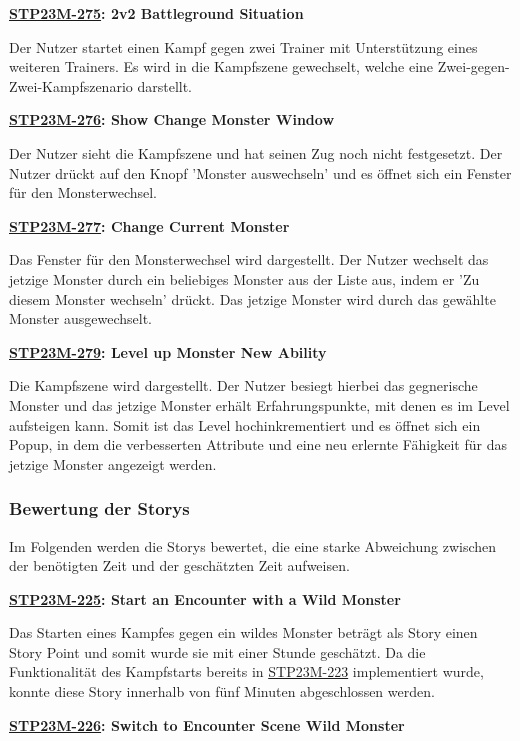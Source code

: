\textbf{\hyperlink{T275}{\hypertarget{S275}{STP23M-275}}: 2v2 Battleground Situation}

Der Nutzer startet einen Kampf gegen zwei Trainer mit Unterstützung eines weiteren Trainers. Es wird in die Kampfszene gewechselt, welche eine Zwei-gegen-Zwei-Kampfszenario darstellt.

\textbf{\hyperlink{T276}{\hypertarget{S276}{STP23M-276}}: Show Change Monster Window}

Der Nutzer sieht die Kampfszene und hat seinen Zug noch nicht festgesetzt. Der Nutzer drückt auf den Knopf 'Monster auswechseln' und es öffnet sich ein Fenster für den Monsterwechsel.

\textbf{\hyperlink{T277}{\hypertarget{S277}{STP23M-277}}: Change Current Monster}

Das Fenster für den Monsterwechsel wird dargestellt. Der Nutzer wechselt das jetzige Monster durch ein beliebiges Monster aus der Liste aus, indem er 'Zu diesem Monster wechseln' drückt. Das jetzige Monster wird durch das gewählte Monster ausgewechselt.

\textbf{\hyperlink{T279}{\hypertarget{S279}{STP23M-279}}: Level up Monster New Ability}

Die Kampfszene wird dargestellt. Der Nutzer besiegt hierbei das gegnerische Monster und das jetzige Monster erhält Erfahrungspunkte, mit denen es im Level aufsteigen kann. Somit ist das Level hochinkrementiert und es öffnet sich ein Popup, in dem die verbesserten Attribute und eine neu erlernte Fähigkeit für das jetzige Monster angezeigt werden.
\subsubsection{Bewertung der Storys}

Im Folgenden werden die Storys bewertet, die eine starke Abweichung zwischen der benötigten Zeit und der geschätzten Zeit aufweisen.

\textbf{\hyperlink{T225}{\hypertarget{S225}{STP23M-225}}: Start an Encounter with a Wild Monster}

Das Starten eines Kampfes gegen ein wildes Monster beträgt als Story einen Story Point und somit wurde sie mit einer Stunde geschätzt. Da die Funktionalität des Kampfstarts bereits in \hyperlink{T223}{\hypertarget{S223}{STP23M-223}} implementiert wurde, konnte diese Story innerhalb von fünf Minuten abgeschlossen werden.

\textbf{\hyperlink{T226}{\hypertarget{S226}{STP23M-226}}: Switch to Encounter Scene Wild Monster}

